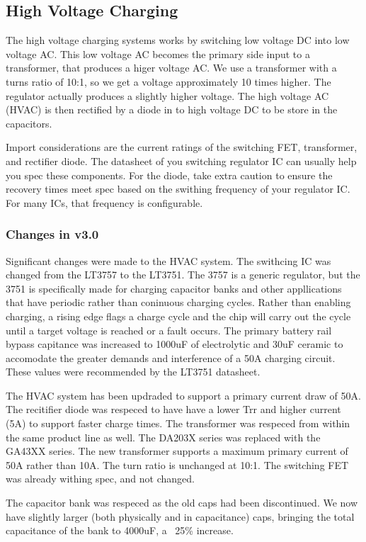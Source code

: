 \documentclass[12pt, letterpaper]{article}
\begin{document}
\subsection{High Voltage Charging}
The high voltage charging systems works by switching low voltage DC into low voltage AC. This low voltage AC becomes the primary side input to a transformer, that produces a higer voltage AC. We use a transformer with a turns ratio of 10:1, so we get a voltage approximately 10 times higher. The regulator actually produces a slightly higher voltage. The high voltage AC (HVAC) is then rectified by a diode in to high voltage DC to be store in the capacitors. 

Import considerations are the current ratings of the switching FET, transformer, and rectifier diode. The datasheet of you switching regulator IC can usually help you spec these components. For the diode, take extra caution to ensure the recovery times meet spec based on the swithing frequency of your regulator IC. For many ICs, that frequency is configurable.

\subsubsection{Changes in v3.0}
Significant changes were made to the HVAC system. The swithcing IC was changed from the LT3757 to the LT3751. The 3757 is a generic regulator, but the 3751 is specifically made for charging capacitor banks and other appllications that have periodic rather than coninuous charging cycles. Rather than enabling charging, a rising edge flags a charge cycle and the chip will carry out the cycle until a target voltage is reached or a fault occurs. The primary battery rail bypass capitance was increased to 1000uF of electrolytic and 30uF ceramic to accomodate the greater demands and interference of a 50A charging circuit. These values were recommended by the LT3751 datasheet.

The HVAC system has been updraded to support a primary current draw of 50A. The recitifier diode was respeced to have have a lower Trr and higher current (5A) to support faster charge times. The transformer was respeced from within the same product line as well. The DA203X series was replaced with the GA43XX series. The new transformer supports a maximum primary current of 50A rather than 10A. The turn ratio is unchanged at 10:1. The switching FET was already withing spec, and not changed. 

The capacitor bank was respeced as the old caps had been discontinued. We now have slightly larger (both physically and in capacitance) caps, bringing the total capacitance of the bank to 4000uF, a ~25\% increase.
\end{document}
